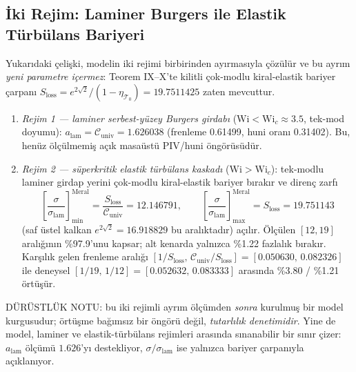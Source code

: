 \documentclass[12pt,a4paper]{article}
\begin{document}
\subsection*{İki Rejim: Laminer Burgers ile Elastik Türbülans Bariyeri}
Yukarıdaki çelişki, modelin iki rejimi birbirinden ayırmasıyla çözülür ve
bu ayrım \emph{yeni parametre içermez}: Teorem IX--X'te kilitli çok-modlu
kiral-elastik bariyer çarpanı $S_{\mathrm{loss}}=e^{2\sqrt{2}}/(1-\eta_{\mathcal{T}_0})
=19.7511425$ zaten mevcuttur.
\begin{enumerate}
    \item \textit{Rejim 1 --- laminer serbest-yüzey Burgers girdabı}
    ($\mathrm{Wi}<\mathrm{Wi}_c\approx 3.5$, tek-mod doyumu):
    $a_{\mathrm{lam}}=\mathcal{C}_{\mathrm{univ}}=1.626038$
    (frenleme 0.61499, huni oranı 0.31402). Bu, henüz ölçülmemiş açık
    masaüstü PIV/huni öngörüsüdür.
    \item \textit{Rejim 2 --- süperkritik elastik türbülans kaskadı}
    ($\mathrm{Wi}>\mathrm{Wi}_c$): tek-modlu laminer girdap yerini çok-modlu
    kiral-elastik bariyer bırakır ve direnç zarfı
    \begin{equation}
    \left[\frac{\sigma}{\sigma_{\mathrm{lam}}}\right]_{\min}^{\mathrm{Meral}}
    =\frac{S_{\mathrm{loss}}}{\mathcal{C}_{\mathrm{univ}}}=12.146791,
    \qquad
    \left[\frac{\sigma}{\sigma_{\mathrm{lam}}}\right]_{\max}^{\mathrm{Meral}}
    =S_{\mathrm{loss}}=19.751143
    \end{equation}
    (saf üstel kalkan $e^{2\sqrt{2}}=16.918829$ bu aralıktadır) açılır.
    Ölçülen $[12,19]$ aralığının \%97.9'unu kapsar; alt kenarda yalnızca
    \%1.22 fazlalık bırakır. Karşılık gelen frenleme aralığı
    $[1/S_{\mathrm{loss}},\,\mathcal{C}_{\mathrm{univ}}/S_{\mathrm{loss}}]
    =[0.050630,\,0.082326]$ ile deneysel $[1/19,\,1/12]=[0.052632,\,0.083333]$
    arasında \%3.80 / \%1.21 örtüşür.
\end{enumerate}
DÜRÜSTLÜK NOTU: bu iki rejimli ayrım ölçümden \emph{sonra} kurulmuş bir
model kurgusudur; örtüşme bağımsız bir öngörü değil, \emph{tutarlılık
denetimidir}. Yine de model, laminer ve elastik-türbülans rejimleri
arasında sınanabilir bir sınır çizer: $a_{\mathrm{lam}}$ ölçümü
$1.626$'yı destekliyor, $\sigma/\sigma_{\mathrm{lam}}$ ise yalnızca bariyer
çarpanıyla açıklanıyor.
\end{document}
